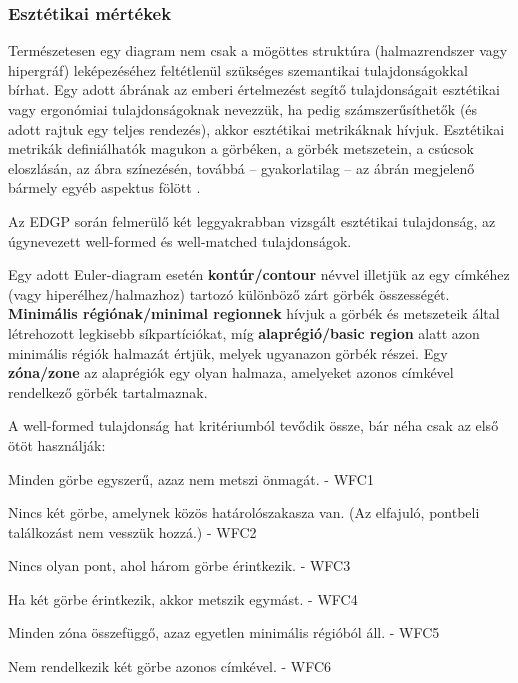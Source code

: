 \subsubsection{Esztétikai mértékek} \label{eulerAesthetic}

Természetesen egy diagram nem csak a mögöttes struktúra (halmazrendszer vagy hipergráf) leképezéséhez feltétlenül szükséges szemantikai tulajdonságokkal bírhat. Egy adott ábrának az emberi értelmezést segítő tulajdonságait esztétikai vagy ergonómiai tulajdonságoknak nevezzük, ha pedig számszerűsíthetők (és adott rajtuk egy teljes rendezés), akkor esztétikai metrikáknak hívjuk. Esztétikai metrikák definiálhatók magukon a görbéken, a görbék metszetein, a csúcsok eloszlásán, az ábra színezésén, továbbá -- gyakorlatilag -- az ábrán megjelenő bármely egyéb aspektus fölött \cite{euler_force, which_well_formed, layout_metrics}.


Az EDGP során felmerülő két leggyakrabban vizsgált\cite{wellmatched_important, euler_force, which_well_formed, well_matchedness, orientation_comprehension} esztétikai tulajdonság, az úgynevezett well-formed és well-matched tulajdonságok.

\begin{definition}
Egy adott Euler-diagram esetén \textbf{kontúr/contour} névvel illetjük az egy címkéhez (vagy hiperélhez/halmazhoz) tartozó különböző zárt görbék összességét. \textbf{Minimális régiónak/minimal regionnek} hívjuk a görbék és metszeteik által létrehozott legkisebb síkpartíciókat, míg \textbf{alaprégió/basic region} alatt azon minimális régiók halmazát értjük, melyek ugyanazon görbék részei. Egy \textbf{zóna/zone} az alaprégiók egy olyan halmaza, amelyeket azonos címkével rendelkező görbék tartalmaznak.
\end{definition}

A well-formed tulajdonság hat kritériumból tevődik össze, bár néha csak az első ötöt használják:

\begin{compactenum} \label{wfc}
	\item Minden görbe egyszerű, azaz nem metszi önmagát. - WFC1 \label{step:wfc1}
	\item Nincs két görbe, amelynek közös határolószakasza van. (Az elfajuló, pontbeli találkozást nem vesszük hozzá.) - WFC2 \label{step:wfc2}
	\item Nincs olyan pont, ahol három görbe érintkezik. - WFC3 \label{step:wfc3}
	\item Ha két görbe érintkezik, akkor metszik egymást. - WFC4 \label{step:wfc4}
	\item Minden zóna összefüggő, azaz egyetlen minimális régióból áll. - WFC5 \label{step:wfc5}
	\item Nem rendelkezik két görbe azonos címkével. - WFC6 \label{step:wfc6}\\
\end{compactenum}

